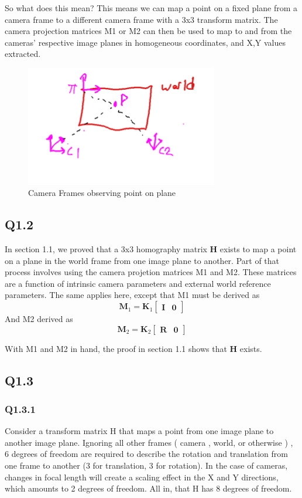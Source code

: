 \documentclass[12pt]{article}
\begin{document}
So what does this mean? This means we can map a point on a fixed plane from a camera frame to a different camera frame with a 3x3 transform matrix. The camera projection matrices M1 or M2 can then be used to map to and from the cameras' respective image planes in homogeneous coordinates, and X,Y values extracted.

\begin{figure}[H]
\centering
\includegraphics[page=1,width=0.75\textwidth]{q1_1a}
\caption{ Camera Frames observing point on plane } 
\label{fig:autoencout}
\end{figure}   


\subsection{Q1.2}

In section 1.1, we proved that a 3x3 homography matrix $\textbf{H}$ exists to map a point on a plane in the world frame from one image plane to another. Part of that process involves using the camera projetion matrices M1 and M2. These matrices are a function of intrinsic camera parameters and external world reference parameters.
The same applies here, except that M1 must be derived as  
$$
\textbf{M}_{1} = 
\textbf{K}_{1} 
\begin{bmatrix}
\textbf{I} & \textbf{0}
\end{bmatrix}
$$
And M2 derived as
$$
\textbf{M}_{2} = 
\textbf{K}_{2} 
\begin{bmatrix}
\textbf{R} & \textbf{0}
\end{bmatrix}
$$

With M1 and M2 in hand, the proof in section 1.1 shows that $\textbf{H}$ exists.

\subsection{Q1.3}
\subsubsection{Q1.3.1}
Consider a transform matrix H that maps a point from one image plane to another image plane. Ignoring all other frames ( camera , world, or otherwise ) , 6 degrees of freedom are required to describe the rotation and translation from one frame to another (3 for translation, 3 for rotation). In the case of cameras, changes in focal length will create a scaling effect in the X and Y directions, which amounts to 2 degrees of freedom. All in, that H has 8 degrees of freedom.
\end{document}
